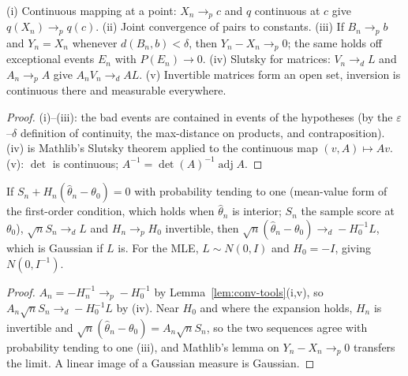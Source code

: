 \begin{lemma}
\label{lem:conv-tools}
\leanok
(i) Continuous mapping at a point: $X_n\to_p c$ and $q$ continuous at $c$ give $q(X_n)\to_p q(c)$. (ii) Joint
convergence of pairs to constants. (iii) If $B_n\to_p b$ and $Y_n = X_n$ whenever $d(B_n,b)<\delta$, then
$Y_n - X_n\to_p 0$; the same holds off exceptional events $E_n$ with $P(E_n)\to0$. (iv) Slutsky for matrices: $V_n\to_d L$ and $A_n\to_p A$ give $A_nV_n\to_d AL$. (v) Invertible
matrices form an open set, inversion is continuous there and measurable everywhere.
\end{lemma}
\begin{proof}
\leanok
(i)--(iii): the bad events are contained in events of the hypotheses (by the $\varepsilon$--$\delta$ definition of
continuity, the max-distance on products, and contraposition). (iv) is Mathlib's Slutsky theorem applied to the
continuous map $(v,A)\mapsto Av$. (v): $\det$ is continuous; $A^{-1} = \det(A)^{-1}\operatorname{adj}A$.
\end{proof}

\begin{theorem}
\label{thm:z-estimator}
\leanok
{}
If $S_n + H_n(\hat\theta_n - \theta_0) = 0$ with probability tending to one (mean-value form of the first-order
condition, which holds when $\hat\theta_n$ is interior; $S_n$ the sample score at $\theta_0$), $\sqrt n S_n\to_d L$ and $H_n\to_p H_0$ invertible, then $\sqrt n(\hat\theta_n-\theta_0)\to_d -H_0^{-1}L$,
which is Gaussian if $L$ is. For the MLE, $L\sim N(0,I)$ and $H_0 = -I$, giving $N(0,I^{-1})$.
\end{theorem}
\begin{proof}
\leanok
$A_n = -H_n^{-1}\to_p -H_0^{-1}$ by Lemma~\ref{lem:conv-tools}(i,v), so $A_n\sqrt nS_n\to_d -H_0^{-1}L$ by (iv). Near
$H_0$ and where the expansion holds, $H_n$ is invertible and $\sqrt n(\hat\theta_n-\theta_0) = A_n\sqrt nS_n$, so the two sequences agree with
probability tending to one (iii), and Mathlib's lemma on $Y_n - X_n\to_p 0$ transfers the limit. A linear image of a
Gaussian measure is Gaussian.
\end{proof}

